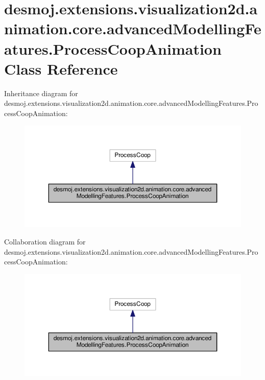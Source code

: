 \section{desmoj.\-extensions.\-visualization2d.\-animation.\-core.\-advanced\-Modelling\-Features.\-Process\-Coop\-Animation Class Reference}
\label{classdesmoj_1_1extensions_1_1visualization2d_1_1animation_1_1core_1_1advanced_modelling_features_1_1_process_coop_animation}


Inheritance diagram for desmoj.\-extensions.\-visualization2d.\-animation.\-core.\-advanced\-Modelling\-Features.\-Process\-Coop\-Animation\-:
\nopagebreak
\begin{figure}[H]
\begin{center}
\leavevmode
\includegraphics[width=350pt]{classdesmoj_1_1extensions_1_1visualization2d_1_1animation_1_1core_1_1advanced_modelling_featuresf39bf1c5fd94fd137283a3a31a801682}
\end{center}
\end{figure}


Collaboration diagram for desmoj.\-extensions.\-visualization2d.\-animation.\-core.\-advanced\-Modelling\-Features.\-Process\-Coop\-Animation\-:
\nopagebreak
\begin{figure}[H]
\begin{center}
\leavevmode
\includegraphics[width=350pt]{classdesmoj_1_1extensions_1_1visualization2d_1_1animation_1_1core_1_1advanced_modelling_features4a354028ca49bf8fa6ceac69d37b929d}
\end{center}
\end{figure}

